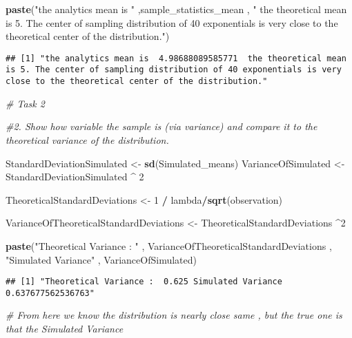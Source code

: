 \documentclass[
]{article}
\newenvironment{Shaded}{\begin{snugshade}}{\end{snugshade}}
\newcommand{\CommentTok}[1]{\textcolor[rgb]{0.56,0.35,0.01}{\textit{#1}}}
\newcommand{\DecValTok}[1]{\textcolor[rgb]{0.00,0.00,0.81}{#1}}
\newcommand{\KeywordTok}[1]{\textcolor[rgb]{0.13,0.29,0.53}{\textbf{#1}}}
\newcommand{\NormalTok}[1]{#1}
\newcommand{\OperatorTok}[1]{\textcolor[rgb]{0.81,0.36,0.00}{\textbf{#1}}}
\newcommand{\StringTok}[1]{\textcolor[rgb]{0.31,0.60,0.02}{#1}}
\begin{document}
\begin{Shaded}
\begin{Highlighting}[]
\KeywordTok{paste}\NormalTok{(}\StringTok{"the analytics mean is "}\NormalTok{ ,sample\_statistics\_mean , }\StringTok{" the theoretical mean is 5. The center of sampling distribution of 40 exponentials is very close to the theoretical center of the distribution."}\NormalTok{)}
\end{Highlighting}
\end{Shaded}

\begin{verbatim}
## [1] "the analytics mean is  4.98688089585771  the theoretical mean is 5. The center of sampling distribution of 40 exponentials is very close to the theoretical center of the distribution."
\end{verbatim}

\begin{Shaded}
\begin{Highlighting}[]
\CommentTok{\# Task 2 }

\CommentTok{\#2. Show how variable the sample is (via variance) and compare it to the theoretical variance of  the distribution.}


\NormalTok{StandardDeviationSimulated \textless{}{-}}\StringTok{ }\KeywordTok{sd}\NormalTok{(Simulated\_means)}
\NormalTok{VarianceOfSimulated \textless{}{-}}\StringTok{ }\NormalTok{StandardDeviationSimulated }\OperatorTok{\^{}}\StringTok{ }\DecValTok{2}

\NormalTok{TheoreticalStandardDeviations \textless{}{-}}\StringTok{ }\DecValTok{1} \OperatorTok{/}\StringTok{ }\NormalTok{lambda}\OperatorTok{/}\KeywordTok{sqrt}\NormalTok{(observation)}

\NormalTok{VarianceOfTheoreticalStandardDeviations \textless{}{-}}\StringTok{ }\NormalTok{TheoreticalStandardDeviations }\OperatorTok{\^{}}\DecValTok{2}

\KeywordTok{paste}\NormalTok{(}\StringTok{"Theoretical Variance : "}\NormalTok{ , VarianceOfTheoreticalStandardDeviations , }\StringTok{"Simulated Variance"}\NormalTok{ , VarianceOfSimulated)}
\end{Highlighting}
\end{Shaded}

\begin{verbatim}
## [1] "Theoretical Variance :  0.625 Simulated Variance 0.637677562536763"
\end{verbatim}

\begin{Shaded}
\begin{Highlighting}[]
\CommentTok{\# From here we know the distribution is nearly close same , but the true one is that the Simulated Variance}
\end{Highlighting}
\end{Shaded}
\end{document}
